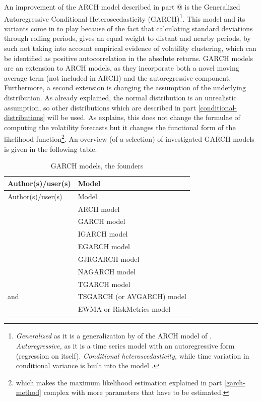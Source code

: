\documentclass[a4paper, twoside]{templates/ociamthesis}
\begin{document}
\noindent An improvement of the ARCH model described in part @ is the Generalized Autoregressive Conditional Heteroscedasticity (GARCH)\footnote{\emph{Generalized} as it is a generalization by \textcite{bollerslev1986} of the ARCH model of \textcite{engle1982}. \emph{Autoregressive,} as it is a time series model with an autoregressive form (regression on itself). \emph{Conditional heteroscedasticity,} while time variation in conditional variance is built into the model \autocite{alexander2008}.}. This model and its variants come in to play because of the fact that calculating standard deviations through rolling periods, gives an equal weight to distant and nearby periods, by such not taking into account empirical evidence of volatility clustering, which can be identified as positive autocorrelation in the absolute returns. GARCH models are an extension to ARCH models, as they incorporate both a novel moving average term (not included in ARCH) and the autoregressive component. Furthermore, a second extension is changing the assumption of the underlying distribution. As already explained, the normal distribution is an unrealistic assumption, so other distributions which are described in part \ref{conditional-distributions} will be used. As \textcite{alexander2008} explains, this does not change the formulae of computing the volatility forecasts but it changes the functional form of the likelihood function\footnote{which makes the maximum likelihood estimation explained in part \ref{garch-method} complex with more parameters that have to be estimated.}. An overview (of a selection) of investigated GARCH models is given in the following table.

\begin{longtable}[]{@{}ll@{}}
\caption{GARCH models, the founders}\tabularnewline
\toprule
Author(s)/user(s) & Model\tabularnewline
\midrule
\endfirsthead
\toprule
Author(s)/user(s) & Model\tabularnewline
\midrule
\endhead
\textcite{engle1982} & ARCH model\tabularnewline
\textcite{bollerslev1986} & GARCH model\tabularnewline
\textcite{bollerslev1986} & IGARCH model\tabularnewline
\textcite{nelson1991} & EGARCH model\tabularnewline
\textcite{glosten1993} & GJRGARCH model\tabularnewline
\textcite{engle1993} & NAGARCH model\tabularnewline
\textcite{zakoian1994} & TGARCH model\tabularnewline
\textcite{taylor1986} and \textcite{schwert1989} & TSGARCH (or AVGARCH) model\tabularnewline
\textcite{morganguarantytrustcompany1996} & EWMA or RiskMetrics model\tabularnewline
\bottomrule
\end{longtable}
\end{document}
